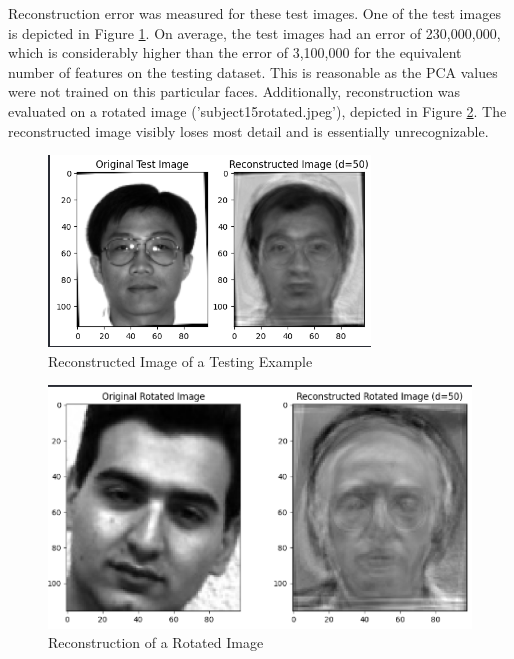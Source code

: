 \documentclass[conference]{IEEEtran}
\begin{document}
Reconstruction error was measured for these test images. One of the test images is depicted in Figure \ref{fig:reconstructed_test}. On average, the test images had an error of 230,000,000, which is considerably higher than the error of 3,100,000 for the equivalent number of features on the testing dataset. This is reasonable as the PCA values were not trained on this particular faces. Additionally, reconstruction was evaluated on a rotated image ('subject15rotated.jpeg'), depicted in Figure \ref{fig:reconstructed_rotated}. The reconstructed image visibly loses most detail and is essentially unrecognizable.


\begin{figure}[htbp]
  \centerline{\includegraphics[scale=0.4]{figures/reconstructed_test.png}}
  \caption{Reconstructed Image of a Testing Example}
  \label{fig:reconstructed_test}
\end{figure}  

\begin{figure}[htbp]
  \centerline{\includegraphics[scale=0.4]{figures/reconstructed_rotated.png}}
  \caption{Reconstruction of a Rotated Image}
  \label{fig:reconstructed_rotated}
\end{figure}  
\end{document}
